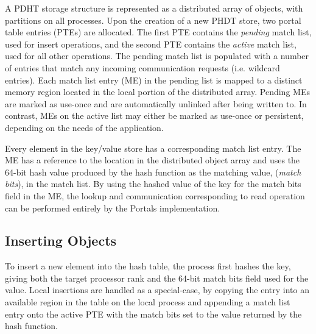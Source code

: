A PDHT storage structure is represented as a distributed array of objects, with
partitions on all processes. Upon the creation of a new PHDT store, two portal
table entries (PTEs) are allocated. The first PTE contains the {\em pending}
match list, used for insert operations, and the second PTE contains the {\em
active} match list, used for all other operations. The pending match list is
populated with a number of entries that match any incoming communication
requests (i.e. wildcard entries). Each match list entry (ME) in the pending
list is mapped to a distinct memory region located in the local portion of the
distributed array. Pending MEs are marked as use-once and are automatically
unlinked after being written to. In contrast, MEs on the active list may either
be marked as use-once or persistent, depending on the needs of the application.

Every element in the key/value store has a corresponding match list entry. The
ME has a reference to the location in the distributed object array and uses
the 64-bit hash value produced by the hash function as the matching value,
({\em match bits}), in the match list. By using the hashed value of the key
for the match bits field in the ME, the lookup and communication corresponding 
to read operation can be performed entirely by the Portals implementation.



%

 

\subsection{Inserting Objects}

To insert a new element into the hash table, the process first hashes the key,
giving both the target processor rank and the 64-bit match bits field used for
the value. Local insertions are handled as a special-case, by copying the entry
into an available region in the table on the local process and appending a
match list entry onto the active PTE with the match bits set to the value
returned by the hash function.

